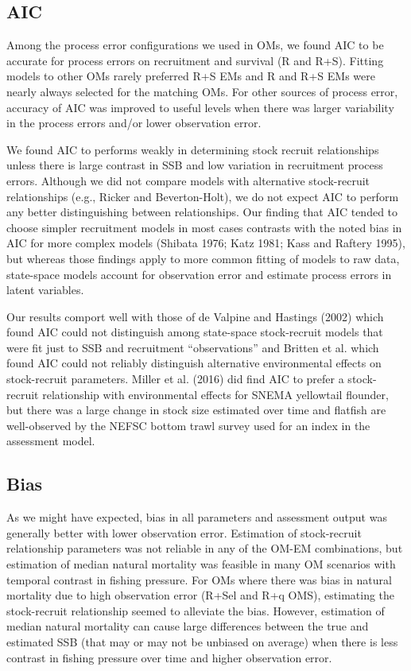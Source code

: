 \documentclass[
  12pt,
]{article}
\begin{document}
\hypertarget{aic}{%
\subsection*{AIC}\label{aic}}

Among the process error configurations we used in OMs, we found AIC to
be accurate for process errors on recruitment and survival (R and R+S).
Fitting models to other OMs rarely preferred R+S EMs and R and R+S EMs
were nearly always selected for the matching OMs. For other sources of
process error, accuracy of AIC was improved to useful levels when there
was larger variability in the process errors and/or lower observation
error.

We found AIC to performs weakly in determining stock recruit
relationships unless there is large contrast in SSB and low variation in
recruitment process errors. Although we did not compare models with
alternative stock-recruit relationships (e.g., Ricker and
Beverton-Holt), we do not expect AIC to perform any better
distinguishing between relationships. Our finding that AIC tended to
choose simpler recruitment models in most cases contrasts with the noted
bias in AIC for more complex models (Shibata 1976; Katz 1981; Kass and
Raftery 1995), but whereas those findings apply to more common fitting
of models to raw data, state-space models account for observation error
and estimate process errors in latent variables.

Our results comport well with those of de Valpine and Hastings (2002)
which found AIC could not distinguish among state-space stock-recruit
models that were fit just to SSB and recruitment ``observations'' and
Britten et al. which found AIC could not reliably distinguish
alternative environmental effects on stock-recruit parameters. Miller et
al. (2016) did find AIC to prefer a stock-recruit relationship with
environmental effects for SNEMA yellowtail flounder, but there was a
large change in stock size estimated over time and flatfish are
well-observed by the NEFSC bottom trawl survey used for an index in the
assessment model.

\hypertarget{bias-2}{%
\subsection*{Bias}\label{bias-2}}

As we might have expected, bias in all parameters and assessment output
was generally better with lower observation error. Estimation of
stock-recruit relationship parameters was not reliable in any of the
OM-EM combinations, but estimation of median natural mortality was
feasible in many OM scenarios with temporal contrast in fishing
pressure. For OMs where there was bias in natural mortality due to high
observation error (R+Sel and R+q OMS), estimating the stock-recruit
relationship seemed to alleviate the bias. However, estimation of median
natural mortality can cause large differences between the true and
estimated SSB (that may or may not be unbiased on average) when there is
less contrast in fishing pressure over time and higher observation
error.
\end{document}

